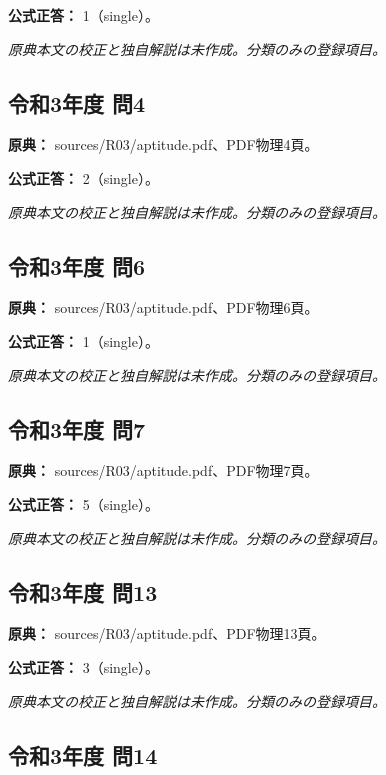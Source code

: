 \textbf{公式正答：} 1（single）。

\par\textit{原典本文の校正と独自解説は未作成。分類のみの登録項目。}

\subsection{令和3年度 問4}
\label{q:r03-reg-apt-04}

\noindent\textbf{原典：} sources/R03/aptitude.pdf、PDF物理4頁。

\textbf{公式正答：} 2（single）。

\par\textit{原典本文の校正と独自解説は未作成。分類のみの登録項目。}

\subsection{令和3年度 問6}
\label{q:r03-reg-apt-06}

\noindent\textbf{原典：} sources/R03/aptitude.pdf、PDF物理6頁。

\textbf{公式正答：} 1（single）。

\par\textit{原典本文の校正と独自解説は未作成。分類のみの登録項目。}

\subsection{令和3年度 問7}
\label{q:r03-reg-apt-07}

\noindent\textbf{原典：} sources/R03/aptitude.pdf、PDF物理7頁。

\textbf{公式正答：} 5（single）。

\par\textit{原典本文の校正と独自解説は未作成。分類のみの登録項目。}

\subsection{令和3年度 問13}
\label{q:r03-reg-apt-13}

\noindent\textbf{原典：} sources/R03/aptitude.pdf、PDF物理13頁。

\textbf{公式正答：} 3（single）。

\par\textit{原典本文の校正と独自解説は未作成。分類のみの登録項目。}

\subsection{令和3年度 問14}
\label{q:r03-reg-apt-14}

